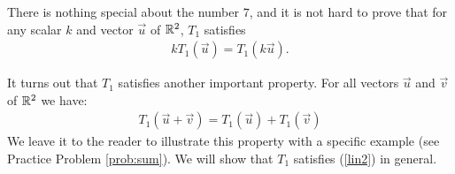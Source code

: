 \documentclass{ximera}
\begin{document}
\begin{initprob}



There is nothing special about the number $7$, and it is not hard to prove that for any scalar $k$ and vector $\vec{u}$ of $\mathbb{R}^2$, $T_1$ satisfies
\begin{align}\label{lin1} kT_1(\vec{u})= T_1(k\vec{u}).\end{align}

It turns out that $T_1$ satisfies another important property. For all vectors $\vec{u}$ and $\vec{v}$ of $\mathbb{R}^2$ we have:
\begin{align}\label{lin2} T_1(\vec{u}+\vec{v}) = T_1(\vec{u})+T_1(\vec{v})\end{align}
We leave it to the reader to illustrate this property with a specific example (see Practice Problem \ref{prob:sum}).  We will show that $T_1$ satisfies (\ref{lin2}) in general.


\end{initprob}
\end{document}
